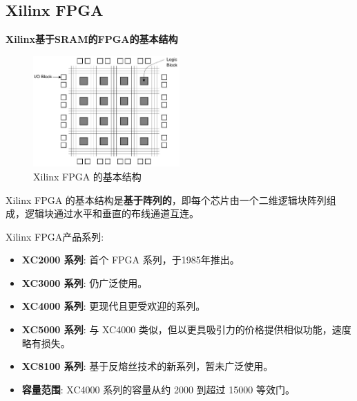 \subsection{Xilinx FPGA}
\begin{frame}{\textbf{Xilinx基于SRAM的FPGA的基本结构}}
\begin{figure}
    \centering
    \includegraphics[width=0.5\textwidth]{img1/FPGA.jpeg}
    \caption{Xilinx FPGA 的基本结构}
\end{figure}
    Xilinx FPGA
    的基本结构是\textbf{基于阵列的}，即每个芯片由一个二维逻辑块阵列组成，逻辑块通过水平和垂直的布线通道互连。
\end{frame}

\begin{frame}{Xilinx FPGA产品系列}:
\begin{itemize}
\item
    \textbf{XC2000 系列}: 首个 FPGA 系列，于1985年推出。
\item
    \textbf{XC3000 系列}: 仍广泛使用。
\item
    \textbf{XC4000 系列}: 更现代且更受欢迎的系列。
\item
    \textbf{XC5000 系列}: 与 XC4000
    类似，但以更具吸引力的价格提供相似功能，速度略有损失。
\item
    \textbf{XC8100 系列}: 基于反熔丝技术的新系列，暂未广泛使用。
\item
    \textbf{容量范围}: XC4000 系列的容量从约 2000 到超过 15000 等效门。
\end{itemize}
\end{frame}

